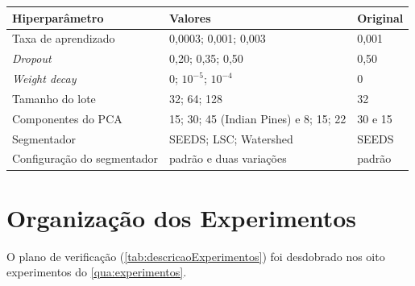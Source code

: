 \begin{quadro}[H]
    \centering
    \small
    \caption{Espaço de busca de hiperparâmetros}
    \begin{tabular}{|l|l|l|}
        \hline
        \rowcolor[HTML]{C0C0C0}
        \textbf{Hiperparâmetro} & \textbf{Valores} & \textbf{Original} \\
        \hline
        Taxa de aprendizado & 0,0003; 0,001; 0,003 & 0,001 \\
        \textit{Dropout} & 0,20; 0,35; 0,50 & 0,50 \\
        \textit{Weight decay} & 0; $10^{-5}$; $10^{-4}$ & 0 \\
        Tamanho do lote & 32; 64; 128 & 32 \\
        Componentes do PCA & 15; 30; 45 (Indian Pines) e 8; 15; 22 & 30 e 15 \\
        Segmentador & SEEDS; LSC; Watershed & SEEDS \\
        Configuração do segmentador & padrão e duas variações & padrão \\
        \hline
    \end{tabular}
    \captionsetup{justification=raggedright}
    \caption*{Fonte: Elaborado pelo autor}
    \label{qua:espaco}
\end{quadro}

\section{Organização dos Experimentos}
\label{sec:desExperimentos}

O plano de verificação (\autoref{tab:descricaoExperimentos}) foi desdobrado nos oito experimentos do \autoref{qua:experimentos}.

